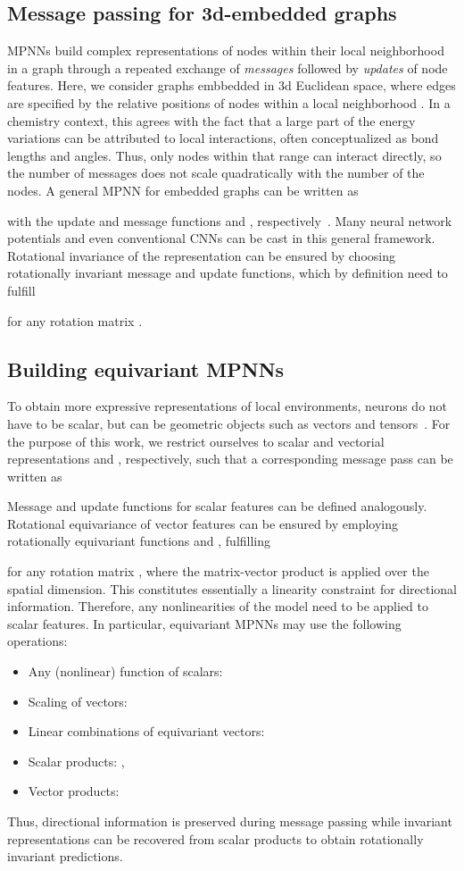 \documentclass[reprint,
amsmath,amssymb,
 aip,jcp
]{revtex4-2}
\newcommand{\new}[1]{#1}
\begin{document}
\subsection{Message passing for 3d-embedded graphs}
MPNNs build complex representations of nodes within their local neighborhood in a graph through a repeated exchange of \emph{messages} followed by \emph{updates} of node features.
Here, we consider graphs embbedded in 3d Euclidean space, where edges are specified by the relative positions  of nodes  within a local neighborhood .
In a chemistry context, this agrees with the fact that a large part of the energy variations can be attributed to local interactions, often conceptualized as bond lengths and angles.
Thus, only nodes within that range can interact directly, so the number of messages does not scale quadratically with the number of the nodes.
A general MPNN for embedded graphs can be written as

with the update and message functions  and , respectively~\cite{gilmer2017neural}.
Many neural network potentials and even conventional CNNs can be cast in this general framework.
\new{Rotational invariance of the representation can be ensured by choosing rotationally invariant message and update functions, which by definition need to fulfill}

\new{for any rotation matrix .}

\subsection{Building equivariant MPNNs}
To obtain more expressive representations of local environments, neurons do not have to be scalar, but can be geometric objects such as vectors and tensors~\cite{hinton2011transforming,cohen2016steerable,thomas2018tensor,anderson2019cormorant}.
For the purpose of this work, we restrict ourselves to scalar and vectorial representations  and , respectively, such that a corresponding message pass can be written as

Message and update functions for scalar features can be defined analogously.
\new{Rotational equivariance of vector features  can be ensured by employing rotationally equivariant functions  and , fulfilling}

\new{for any rotation matrix , where the matrix-vector product is applied over the spatial dimension.}
This constitutes essentially a linearity constraint for directional information.
Therefore, any nonlinearities of the model need to be applied to scalar features.
In particular, equivariant MPNNs may use the following operations:
\begin{itemize}
    \item Any (nonlinear) function of scalars: 
    \item Scaling of vectors: 
    \item Linear combinations of equivariant vectors: 
    \item Scalar products: , 
    \item Vector products: 
\end{itemize}
Thus, directional information is preserved during message passing while invariant representations can be recovered from scalar products to obtain rotationally invariant predictions.
\end{document}
